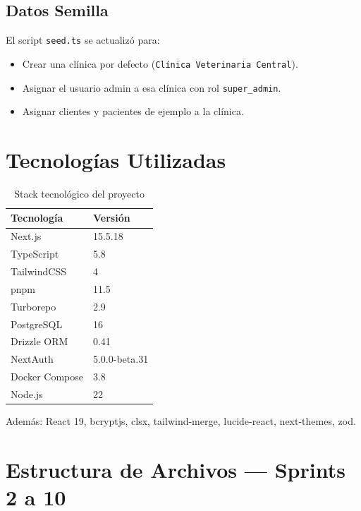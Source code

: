 \documentclass[12pt,a4paper]{article}
\begin{document}
\subsection{Datos Semilla}

El script \texttt{seed.ts} se actualizó para:

\begin{itemize}[leftmargin=*]
    \item Crear una clínica por defecto (\texttt{Clínica Veterinaria Central}).
    \item Asignar el usuario admin a esa clínica con rol \texttt{super\_admin}.
    \item Asignar clientes y pacientes de ejemplo a la clínica.
\end{itemize}

\section{Tecnologías Utilizadas}

\begin{table}[h]
\centering
\caption{Stack tecnológico del proyecto}
\begin{tabularx}{\textwidth}{|l|X|}
\hline
\textbf{Tecnología} & \textbf{Versión} \\
\hline
Next.js & 15.5.18 \\
TypeScript & 5.8 \\
TailwindCSS & 4 \\
pnpm & 11.5 \\
Turborepo & 2.9 \\
PostgreSQL & 16 \\
Drizzle ORM & 0.41 \\
NextAuth & 5.0.0-beta.31 \\
Docker Compose & 3.8 \\
Node.js & 22 \\
\hline
\end{tabularx}
\end{table}

Además: React 19, bcryptjs, clsx, tailwind-merge, lucide-react,
next-themes, zod.

\section{Estructura de Archivos --- Sprints 2 a 10}
\end{document}

